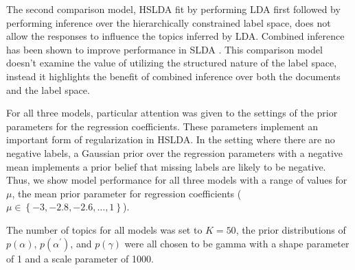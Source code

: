  The second comparison model, HSLDA fit by performing LDA first
followed by performing inference over the hierarchically constrained label
space, does not allow
the responses to influence the topics inferred by LDA.
Combined inference has been shown to improve performance in SLDA
\cite{BleiMcAuliffe2008}. This comparison model doesn't examine the value of utilizing the structured nature 
of the label space, instead it highlights the benefit of combined inference over both the
documents and the label space. 


For all three models, particular attention was given to the settings of the 
prior parameters for the regression coefficients. These parameters implement an
important form of regularization in HSLDA. In the setting where there are no
negative labels, a Gaussian prior over the regression parameters with a
negative mean implements a prior belief that missing labels are likely to be
negative. Thus, we show model performance for all three models with a
range of values for $\mu$, the mean prior parameter for regression coefficients 
($\mu\in\left\{ -3,-2.8,-2.6,\ldots,1\right\}$).

The number of topics for all models was set to $K=50$, the prior distributions of
$p\left(\alpha\right)$, $p\left(\alpha^{\prime}\right)$, and
$p\left(\gamma\right)$ were all chosen to be gamma with a shape parameter of 1 and a
scale parameter of 1000. 

